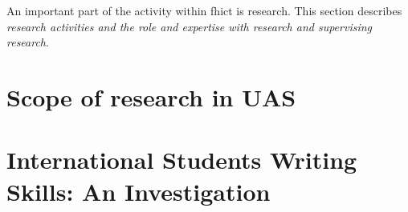 An important part of the activity within \acrshort{fhict} is research. This  section  describes \textit{research activities and the role and expertise with research and supervising research}. 

\section{Scope of research in UAS}\label{chapter:research_scope}


% 

% 

\section{International Students Writing Skills: An Investigation}\label{chapter:research_expertise}


% 


